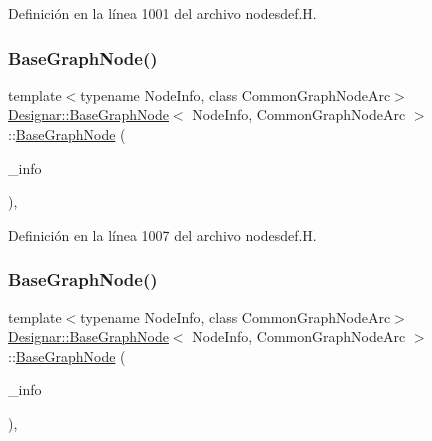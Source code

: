 Definición en la línea 1001 del archivo nodesdef.\+H.

\mbox{\label{class_designar_1_1_base_graph_node_ada20ee8b29e8372f93b7deb6a93c2be1}} 
\subsubsection{\texorpdfstring{Base\+Graph\+Node()}{BaseGraphNode()}\hspace{0.1cm}{\footnotesize\ttfamily [2/4]}}
{\footnotesize\ttfamily template$<$typename Node\+Info, class Common\+Graph\+Node\+Arc$>$ \\
\hyperlink{class_designar_1_1_base_graph_node}{Designar\+::\+Base\+Graph\+Node}$<$ Node\+Info, Common\+Graph\+Node\+Arc $>$\+::\hyperlink{class_designar_1_1_base_graph_node}{Base\+Graph\+Node} (\begin{DoxyParamCaption}\item[{const Node\+Info \&}]{\+\_\+info }\end{DoxyParamCaption})\hspace{0.3cm}{\ttfamily [inline]}, {\ttfamily [protected]}}



Definición en la línea 1007 del archivo nodesdef.\+H.

\mbox{\label{class_designar_1_1_base_graph_node_a3e36c23ee7f22345b2ebbad09304dca0}} 
\subsubsection{\texorpdfstring{Base\+Graph\+Node()}{BaseGraphNode()}\hspace{0.1cm}{\footnotesize\ttfamily [3/4]}}
{\footnotesize\ttfamily template$<$typename Node\+Info, class Common\+Graph\+Node\+Arc$>$ \\
\hyperlink{class_designar_1_1_base_graph_node}{Designar\+::\+Base\+Graph\+Node}$<$ Node\+Info, Common\+Graph\+Node\+Arc $>$\+::\hyperlink{class_designar_1_1_base_graph_node}{Base\+Graph\+Node} (\begin{DoxyParamCaption}\item[{Node\+Info \&\&}]{\+\_\+info }\end{DoxyParamCaption})\hspace{0.3cm}{\ttfamily [inline]}, {\ttfamily [protected]}}



